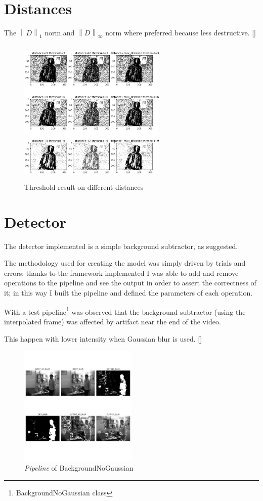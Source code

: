 \documentclass{article}
\newcommand{\CREF}[1]{[\hyperref[#1]{\Cref{#1}}]}
\newcommand{\norm}[1]{\left\lVert#1\right\rVert}
\begin{document}
\section{Distances}
The $\norm{D}_{1}$ norm and $\norm{D}_{\infty}$ norm where preferred because less destructive. \CREF{fig:thr}
\begin{figure}
    \centering
    \includegraphics[width=200pt,height=200pt]{thr_distances.png}
    \caption{Threshold result on different distances}
    \label{fig:thr}
\end{figure}

\section{Detector}
The detector implemented is a simple background subtractor, as suggested.

The methodology used for creating the model was simply driven by trials and errors: thanks to the framework implemented I was able to add and remove operations to the pipeline and see the output in order to assert the correctness of it; in this way I built the pipeline and defined the parameters of each operation.

With a test pipeline\footnote{BackgroundNoGaussian class} was observed that the background subtractor (using the interpolated frame) was affected by artifact near the end of the video.

This happen with lower intensity when Gaussian blur is used. \CREF{fig:gaussian}
\begin{figure}[ht]
    \centering
    \includegraphics[width=0.5\textwidth,keepaspectratio]{background_no_gaussian.PNG}
    \caption{\textit{Pipeline} of BackgroundNoGaussian}
    \label{fig:gaussian}
\end{figure}
\end{document}
